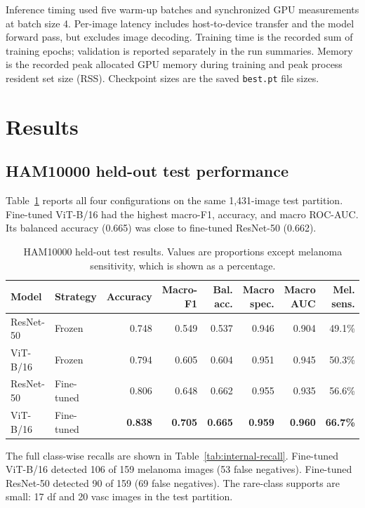 \documentclass[11pt]{article}
\begin{document}
Inference timing used five warm-up batches and synchronized GPU measurements at batch size 4. Per-image latency includes host-to-device transfer and the model forward pass, but excludes image decoding. Training time is the recorded sum of training epochs; validation is reported separately in the run summaries. Memory is the recorded peak allocated GPU memory during training and peak process resident set size (RSS). Checkpoint sizes are the saved \texttt{best.pt} file sizes.

\section{Results}

\subsection{HAM10000 held-out test performance}

Table~\ref{tab:internal} reports all four configurations on the same 1,431-image test partition. Fine-tuned ViT-B/16 had the highest macro-F1, accuracy, and macro ROC-AUC. Its balanced accuracy (0.665) was close to fine-tuned ResNet-50 (0.662).

\begin{table}[H]
\centering
\small
\caption{HAM10000 held-out test results. Values are proportions except melanoma sensitivity, which is shown as a percentage.}
\label{tab:internal}
\begin{tabular}{llrrrrrr}
\toprule
Model & Strategy & Accuracy & Macro-F1 & Bal. acc. & Macro spec. & Macro AUC & Mel. sens.\\
\midrule
ResNet-50 & Frozen & 0.748 & 0.549 & 0.537 & 0.946 & 0.904 & 49.1\%\\
ViT-B/16 & Frozen & 0.794 & 0.605 & 0.604 & 0.951 & 0.945 & 50.3\%\\
ResNet-50 & Fine-tuned & 0.806 & 0.648 & 0.662 & 0.955 & 0.935 & 56.6\%\\
ViT-B/16 & Fine-tuned & \textbf{0.838} & \textbf{0.705} & \textbf{0.665} & \textbf{0.959} & \textbf{0.960} & \textbf{66.7\%}\\
\bottomrule
\end{tabular}
\end{table}

The full class-wise recalls are shown in Table~\ref{tab:internal-recall}. Fine-tuned ViT-B/16 detected 106 of 159 melanoma images (53 false negatives). Fine-tuned ResNet-50 detected 90 of 159 (69 false negatives). The rare-class supports are small: 17 df and 20 vasc images in the test partition.
\end{document}
